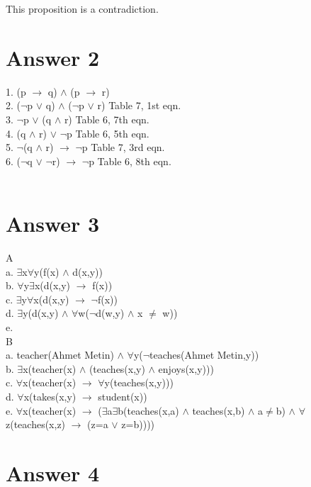 \documentclass[12pt]{article}
\begin{document}
This proposition is a contradiction.\\

\section*{Answer 2}

1. (p $\rightarrow$ q) $\land$ (p $\rightarrow$ r) \\
2. ($\neg$p $\lor$ q) $\land$ ($\neg$p $\lor$ r)    Table 7, 1st eqn. \\
3. $\neg$p $\lor$ (q $\land$ r) 					Table 6, 7th eqn. \\
4. (q $\land$ r) $\lor$ $\neg$p						Table 6, 5th eqn. \\
5. $\neg$(q $\land$ r) $\rightarrow$ $\neg$p		Table 7, 3rd eqn. \\
6. ($\neg$q $\lor$ $\neg$r) $\rightarrow$ $\neg$p   Table 6, 8th eqn. \\\\


\section*{Answer 3}
A\\
	a. 	$\exists$x$\forall$y(f(x) $\land$ d(x,y))\\
    b. 	$\forall$y$\exists$x(d(x,y) $\rightarrow$ f(x))\\
    c.  $\exists$y$\forall$x(d(x,y) $\rightarrow$ $\neg$f(x))\\
    d.  $\exists$y(d(x,y) $\land$ $\forall$w($\neg$d(w,y) $\land$ x $\ne$ w))\\
    e.  \\

B\\
	a. teacher(Ahmet Metin) $\land$ $\forall$y($\neg$teaches(Ahmet Metin,y))\\
    b. $\exists$x(teacher(x) $\land$ (teaches(x,y) $\land$ enjoys(x,y)))\\
    c. $\forall$x(teacher(x) $\rightarrow$ $\forall$y(teaches(x,y)))\\
    d. $\forall$x(takes(x,y) $\rightarrow$ student(x))\\   
    e. $\forall$x(teacher(x) $\rightarrow$ ($\exists$a$\exists$b(teaches(x,a) $\land$ teaches(x,b) $\land$ a$\ne$b) $\land$ $\forall$z(teaches(x,z) $\rightarrow$ (z=a $\lor$ z=b))))\\
\section*{Answer 4}
\end{document}
